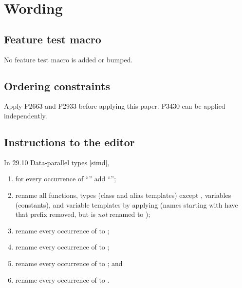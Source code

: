 \section{Wording}\label{sec:wording}

\subsection{Feature test macro}

No feature test macro is added or bumped.

\subsection{Ordering constraints}

Apply P2663 and P2933 before applying this paper.
P3430 can be applied independently.

\subsection{Instructions to the editor}

In 29.10 Data-parallel types [simd],
\begin{enumerate}
  \item
    for every occurrence of “” add “”;

  \item
    rename all functions, types (class and alias templates) except
    , variables (constants), and variable templates by applying
     (names starting with  have that
     prefix removed, but  is \emph{not} renamed to
  );

  \item rename every occurrence of  to ;
  \item rename every occurrence of  to ;
  \item rename every occurrence of  to ; and
  \item rename every occurrence of  to .
\end{enumerate}

